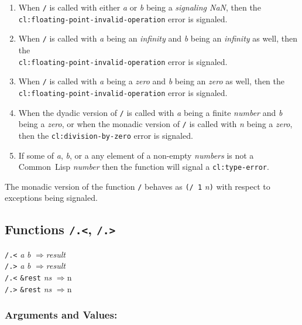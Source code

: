 \documentclass[10pt,fleqn]{article}
\newcommand{\CL}{\textsf{Common~Lisp}}
\newcommand{\code}[1]{\texttt{#1}}
\newcommand{\clieeeterm}[1]{\textit{#1}}
\newcommand{\varname}[1]{\textit{#1}}
\newcommand{\clterm}[1]{\textit{#1}}
\newcommand{\clname}[1]{\texttt{#1}}
\newcommand{\RArrow}{$\Rightarrow$}
\newcommand{\DDictionaryItem}[1]{\vspace*{6pt}\noindent\hrulefill\vspace*{-9pt}\subsection*{#1}}
\newcommand{\DArgsNValues}{\subsubsection*{Arguments and Values:}}
\begin{document}
\begin{enumerate}
\item When \code{/} is called with either \varname{a} or \varname{b}
  being a \emph{signaling NaN}, then the\\
  \clname{cl:floating-point-invalid-operation} error is signaled.

\item When \code{/} is called with \varname{a} being an 
  \clieeeterm{infinity} and \varname{b} being an 
  \clieeeterm{infinity} as well, then the\\
  \clname{cl:floating-point-invalid-operation} error is signaled.

\item When \code{/} is called with \varname{a} being a
  \clieeeterm{zero} and \varname{b} being an 
  \clieeeterm{zero} as well, then the\\
  \clname{cl:floating-point-invalid-operation} error is signaled.

\item When the dyadic version of \code{/} is called with \varname{a}
  being a finite \clterm{number} and \varname{b} being a
  \clieeeterm{zero}, or when the monadic version of \code{/} is called
  with \varname{n} being a \clieeeterm{zero}, then the
  \clname{cl:division-by-zero} error is signaled.

\item If some of \varname{a}, \varname{b}, or a
  any element of a non-empty
  \varname{numbers} is not a \CL{} \clterm{number} then the function
  will signal a \clname{cl:type-error}.
\end{enumerate}

\noindent
The monadic version of the function \code {/} behaves as \code{(/ 1}
\varname{n}\code{)} with respect to exceptions being signaled.


\DDictionaryItem{Functions \code{/.<}, \code{/.>}}
\index{*!\code{/.<}}
\index{*!\code{/.>}}


\code{/.<} \varname{a} \varname{b} \RArrow \varname{result}\\
\code{/.>} \varname{a} \varname{b} \RArrow \varname{result}\\
\code{/.<} \code{\&rest} \varname{ns} \RArrow \varname \code{n}\\
\code{/.>} \code{\&rest} \varname{ns} \RArrow \varname \code{n}\\

\DArgsNValues{}
\end{document}
